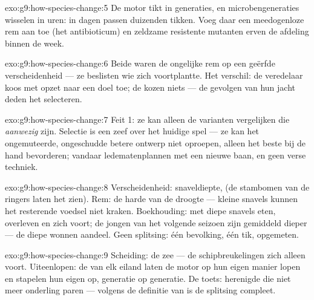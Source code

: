 \begin{solution}{exo:g9:how-species-change:5}
De motor tikt in generaties, en microbengeneraties wisselen in
uren: in dagen passen duizenden tikken. Voeg daar een meedogenloze
rem aan toe (het antibioticum) en zeldzame resistente mutanten
erven de afdeling binnen de week.
\end{solution}

\begin{solution}{exo:g9:how-species-change:6}
Beide waren de ongelijke rem op een geërfde verscheidenheid ---
ze beslisten wie zich voortplantte. Het verschil: de veredelaar
koos met opzet naar een doel toe; de  kozen niets --- de
gevolgen van hun jacht deden het selecteren.
\end{solution}

\begin{solution}{exo:g9:how-species-change:7}
Feit 1: ze kan alleen de varianten vergelijken die \emph{aanwezig}
zijn. Selectie is een zeef over het huidige spel --- ze kan het
ongemuteerde, ongeschudde betere ontwerp niet oproepen, alleen het
beste bij de hand bevorderen; vandaar ledematenplannen met een
nieuwe baan, en geen verse techniek.
\end{solution}

\begin{solution}{exo:g9:how-species-change:8}
Verscheidenheid: snaveldiepte,  (de stambomen van de
ringers laten het zien). Rem: de harde  van de droogte ---
kleine snavels kunnen het resterende voedsel niet kraken.
Boekhouding:  met diepe snavels eten, overleven en 
zich voort; de jongen van het volgende seizoen zijn gemiddeld
dieper --- de diepe  wonnen aandeel. Geen splitsing: één
bevolking, één tik, opgemeten.
\end{solution}

\begin{solution}{exo:g9:how-species-change:9}
Scheiding: de zee --- de schipbreukelingen  zich alleen
voort. Uiteenlopen: de  van elk eiland laten de motor
op hun eigen manier lopen en stapelen hun eigen  op,
generatie op generatie. De toets: herenigde  die niet meer
onderling paren --- volgens de definitie van  is de splitsing
compleet.
\end{solution}

